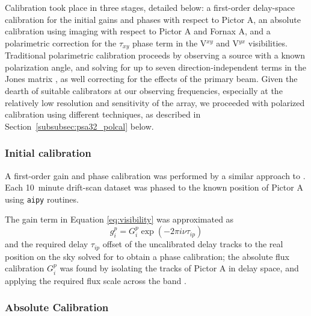 Calibration took place in three stages, detailed below: a first-order delay-space calibration for the initial gains and phases with respect to Pictor A, an absolute calibration using imaging with respect to Pictor A and Fornax A, and a polarimetric correction for the $\tau_{xy}$ phase term in the V$^{xy}$ and V$^{yx}$ visibilities. 
Traditional polarimetric calibration proceeds by observing a source with a known polarization angle, and solving for up to seven direction-independent terms in the Jones matrix \citep[e.g.][]{TMS, HBS.1.96}, as well correcting for the effects of the primary beam. 
Given the dearth of suitable calibrators at our observing frequencies, especially at the relatively low resolution and sensitivity of the array, we proceeded with polarized calibration using different techniques, as described in Section~\ref{subsubsec:psa32_polcal} below.

\subsubsection{Initial calibration}
A first-order gain and phase calibration was performed by a similar approach to \citet{Jacobs.13}. Each 10~minute drift-scan dataset was phased to the known position of Pictor A using {\tt aipy} routines.

The gain term in Equation \ref{eq:visibility} was approximated as 
\begin{equation}
 g^p_i = G^p_i \exp(-2\pi i \nu \tau_{ip})
\end{equation}
and the required delay $\tau_{ip}$ offset of the uncalibrated delay tracks to the real position on the sky solved for to obtain a phase calibration; the absolute flux calibration $G^p_i$ was found by isolating the tracks of Pictor A in delay space, and applying the required flux scale across the band \citep[for a discussion of delay-space calibration, see][and Figure~\ref{fig:delay_spectra}]{Parsons.12a}.

\subsubsection{Absolute Calibration}
\label{subsubsec:psa32_abscal}

